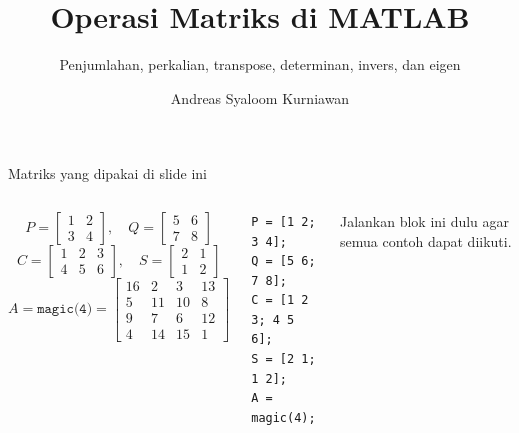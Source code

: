 \documentclass[aspectratio=169,11pt]{beamer}
\title{Operasi Matriks di MATLAB}
\subtitle{Penjumlahan, perkalian, transpose, determinan, invers, dan eigen}
\author{Andreas Syaloom Kurniawan}
\institute{Faculty of Economics and Business, Universitas Gadjah Mada}
\date{}
\begin{document}
\maketitle

\begin{frame}[fragile]{Matriks yang dipakai di slide ini}
\begin{columns}[T]
\small
\[
P=\begin{bmatrix}1&2\\3&4\end{bmatrix},\quad
Q=\begin{bmatrix}5&6\\7&8\end{bmatrix}
\]
\[
C=\begin{bmatrix}1&2&3\\4&5&6\end{bmatrix},\quad
S=\begin{bmatrix}2&1\\1&2\end{bmatrix}
\]
\[
A=\texttt{magic(4)}=
\begin{bmatrix}
16&2&3&13\\5&11&10&8\\9&7&6&12\\4&14&15&1
\end{bmatrix}
\]
\begin{lstlisting}[basicstyle=\ttfamily\footnotesize]
P = [1 2; 3 4];
Q = [5 6; 7 8];
C = [1 2 3; 4 5 6];
S = [2 1; 1 2];
A = magic(4);
\end{lstlisting}
\small Jalankan blok ini dulu agar semua contoh dapat diikuti.
\end{columns}
\end{frame}
\end{document}
